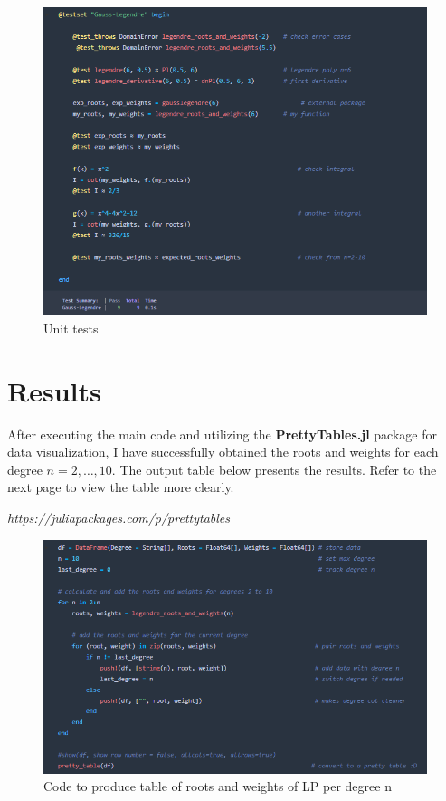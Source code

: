 \documentclass[twoside]{article}
\begin{document}
\begin{figure}[H]
\centering
\includegraphics[scale=0.65]{img/test.png}
\caption{Unit tests}
\end{figure}

\newpage

\section{Results}

After executing the main code and utilizing the \textbf{PrettyTables.jl} package for data visualization, I have successfully obtained the roots and weights for each degree $n = 2, \ldots, 10$. The output table below presents the results. Refer to the next page to view the table more clearly.

\textit{https://juliapackages.com/p/prettytables}

\begin{figure}[ht]
\centering
\includegraphics[scale=0.75]{img/create-table.png}
\caption{Code to produce table of roots and weights of LP per degree n}
\end{figure}
\end{document}
